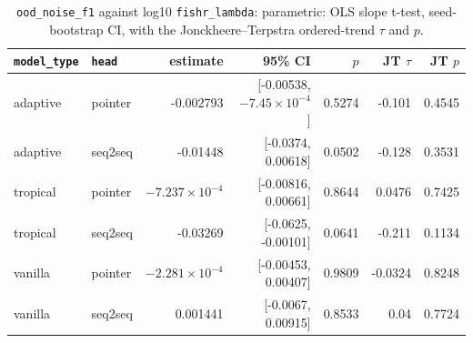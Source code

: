 \documentclass[10pt]{article}
\begin{document}
{\small
\begin{longtable}{llrrrrr}
\caption{\texttt{ood\_noise\_f1} against log10 \texttt{fishr\_lambda}: parametric: OLS slope t-test, seed-bootstrap CI, with the Jonckheere--Terpstra ordered-trend $\tau$ and $p$.}\label{tab:trend-ood_noise_f1}\\
\toprule
\texttt{model\_type} & \texttt{head} & estimate & 95\% CI & $p$ & JT $\tau$ & JT $p$\\
\midrule
\endhead
adaptive & pointer & -0.002793 & [-0.00538, $-7.45\times10^{-4}$] & 0.5274 & -0.101 & 0.4545\\
adaptive & seq2seq & -0.01448 & [-0.0374, 0.00618] & 0.0502 & -0.128 & 0.3531\\
tropical & pointer & $-7.237\times10^{-4}$ & [-0.00816, 0.00661] & 0.8644 & 0.0476 & 0.7425\\
tropical & seq2seq & -0.03269 & [-0.0625, -0.00101] & 0.0641 & -0.211 & 0.1134\\
vanilla & pointer & $-2.281\times10^{-4}$ & [-0.00453, 0.00407] & 0.9809 & -0.0324 & 0.8248\\
vanilla & seq2seq & 0.001441 & [-0.0067, 0.00915] & 0.8533 & 0.04 & 0.7724\\
\bottomrule
\end{longtable}
}
\end{document}
